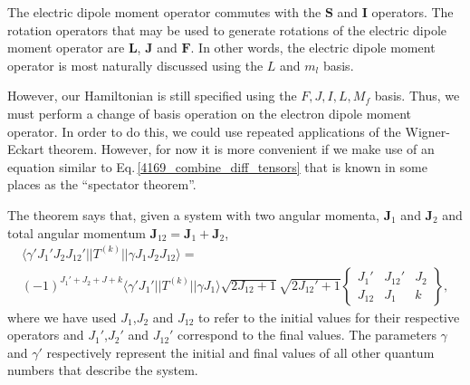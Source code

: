 The electric dipole moment operator commutes with the $\mathbf{S}$ and $\mathbf{I}$ operators. The rotation operators that may be used to generate rotations of the electric dipole moment operator are $\mathbf{L}$, $\mathbf{J}$ and $\mathbf{F}$\cite{DeMille_presentation}. In other words, the electric dipole moment operator is most naturally discussed using the $L$ and $m_l$ basis. 

However, our Hamiltonian is still specified using the $F,J,I,L,M_f$ basis. Thus, we must perform a change of basis operation on the electron dipole moment operator. In order to do this, we could use repeated applications of the Wigner-Eckart theorem.  
However, for now it is more convenient if we make use of an equation similar to Eq.\,\ref{4169_combine_diff_tensors} that is known in some places as the ``spectator theorem''\cite{DeMille_presentation}. %

The theorem says that, given a system with two angular momenta, $\mathbf{J}_1$ and $\mathbf{J}_2$ and total angular momentum $\mathbf{J}_{12}=\mathbf{J}_1+\mathbf{J}_2$,
\begin{multline}\label{spectatorTheorem}
\langle\gamma' J_1'J_2J_{12}'||T^{(k)}||\gamma J_1 J_2 J_{12}\rangle=
\\(-1)^{J_1'+J_2+J+k}\langle\gamma'J_1'||T^{(k)}||\gamma J_1\rangle
\sqrt{2J_{12}+1}\sqrt{2J_{12}'+1}
\begin{Bmatrix}
J_1' & J_{12}' & J_2 \\
J_{12} & J_1 & k
\end{Bmatrix},
\end{multline}
where we have used $J_{1}$,$J_{2}$ and $J_{12}$ to refer to the initial values for their respective operators and $J_{1}'$,$J_{2}'$ and $J_{12}'$ correspond to the final values. The parameters $\gamma$ and $\gamma'$ respectively represent the initial and final values of all other quantum numbers that describe the system.

